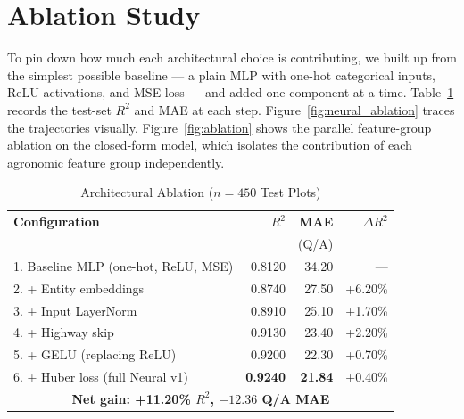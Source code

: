 \documentclass[conference,10pt,letterpaper]{IEEEtran}
\begin{document}
\section{Ablation Study}
\label{sec:ablation}

To pin down how much each architectural choice is contributing, we built up from the simplest possible baseline --- a plain MLP with one-hot categorical inputs, ReLU activations, and MSE loss --- and added one component at a time. Table~\ref{tab:ablation} records the test-set $R^2$ and MAE at each step. Figure~\ref{fig:neural_ablation} traces the trajectories visually. Figure~\ref{fig:ablation} shows the parallel feature-group ablation on the closed-form model, which isolates the contribution of each agronomic feature group independently.

\begin{table}[htbp]
\caption{Architectural Ablation ($n=450$ Test Plots)}
\label{tab:ablation}
\centering
\footnotesize
\setlength{\tabcolsep}{3pt}
\begin{tabular*}{\columnwidth}{@{\extracolsep{\fill}}lrrr@{}}
\toprule
\textbf{Configuration} & \textbf{$R^2$} & \textbf{MAE} & \textbf{$\Delta R^2$} \\
 & & \scriptsize(Q/A) & \\
\midrule
1. Baseline MLP (one-hot, ReLU, MSE)  & 0.8120 & 34.20 & --- \\
2. + Entity embeddings                & 0.8740 & 27.50 & +6.20\% \\
3. + Input LayerNorm                  & 0.8910 & 25.10 & +1.70\% \\
4. + Highway skip                     & 0.9130 & 23.40 & +2.20\% \\
5. + GELU (replacing ReLU)            & 0.9200 & 22.30 & +0.70\% \\
6. + Huber loss (full Neural v1)      & \textbf{0.9240} & \textbf{21.84} & +0.40\% \\
\midrule
\multicolumn{4}{c}{\textbf{Net gain: +11.20\% $R^2$, $-12.36$ Q/A MAE}} \\
\bottomrule
\end{tabular*}
\end{table}
\end{document}
